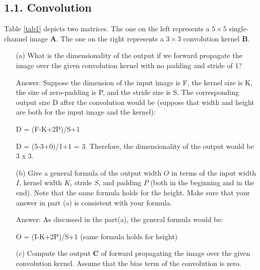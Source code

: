 \documentclass[12pt,letterpaper]{article}
\newcommand{\matr}[1]{\bm{#1}}     %
\begin{document}
\subsection*{1.1. Convolution}
Table \ref{tab1} depicts two matrices. The one on the left represents a $5\times 5$ single-channel image $\matr{A}$. The one on the right
 represents a $3\times 3$ convolution kernel $\matr{B}$. 
\begin{itemize}
    \item[(a)] What is the dimensionality of the output if we forward propagate the image over the given convolution kernel with no padding and stride of 1? 
    
    Answer: Suppose the dimension of the input image is F, the kernel size is K, the size of zero-padding is P, and the stride size is S. The corresponding output size D after the convolution would be (suppose that width and height are both for the input image and the kernel):
    \begin{center}
        D = (F-K+2P)/S+1 
    \end{center}
    D = (5-3+0)/1+1 = 3. Therefore, the dimensionality of the output would be 3 x 3. 
    
    \item[(b)] Give a general formula of the output width $O$ in terms of the input width $I$, kernel width $K$, stride $S$, and padding $P$ (both in the beginning and in the end). Note that the same formula holds for the height. Make sure that your answer in part (a) is consistent with your formula. 
    
    Answer: As discussed in the part(a), the general formula would be:
    \begin{center}
        O = (I-K+2P)/S+1 (same formula holds for height)
    \end{center}
    
    \item[(c)] Compute the output $\matr{C}$ of forward propagating the image over the
given convolution kernel. Assume that the bias term of the convolution is zero.


\end{itemize}
\end{document}

